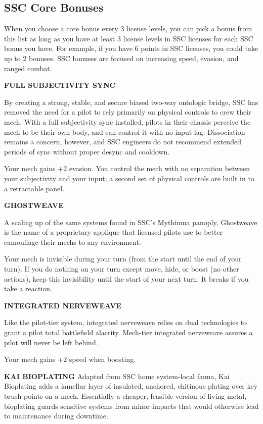 \subsection{SSC Core Bonuses}


When you choose a core bonus every 3 license levels, you can pick a bonus from this list as long as you have at least 3 license levels in SSC licenses for each SSC bonus you have. For example, if you have 6 points in SSC licenses, you could take up to 2 bonuses. SSC bonuses are focused on increasing speed, evasion, and ranged combat.


\textbf{FULL SUBJECTIVITY SYNC}

By creating a strong, stable, and secure biased two-way ontologic bridge, SSC has removed the need for a pilot to rely primarily on physical controls to crew their mech. With a full subjectivity sync installed, pilots in their chassis perceive the mech to be their own body, and can control it with no input lag. Dissociation remains a concern, however, and SSC engineers do not recommend extended periods of sync without proper desync and cooldown.

Your mech gains +2 evasion. You control the mech with no separation between your subjectivity and your input; a second set of physical controls are built in to a retractable panel.


\textbf{GHOSTWEAVE}

A scaling up of the same systems found in SSC's Mythimna panoply, Ghostweave is the name of a proprietary applique that licensed pilots use to better camouflage their mechs to any environment.

Your mech is invisible during your turn (from the start until the end of your turn). If you do nothing on your turn except move, hide, or boost (no other actions), keep this invisibility until the start of your next turn. It breaks if you take a reaction.


\textbf{INTEGRATED NERVEWEAVE}

Like the pilot-tier system, integrated nerveweave relies on dual technologies to grant a pilot total battlefield alacrity. Mech-tier integrated nerveweave assures a pilot will never be left behind.

Your mech gains +2 speed when boosting.


\textbf{KAI BIOPLATING}
Adapted from SSC home system-local fauna, Kai Bioplating adds a lamellar layer of insulated, anchored, chitinous plating over key brush-points on a mech. Essentially a cheaper, feasible version of living metal, bioplating guards sensitive systems from minor impacts that would otherwise lead to maintenance during downtime.

